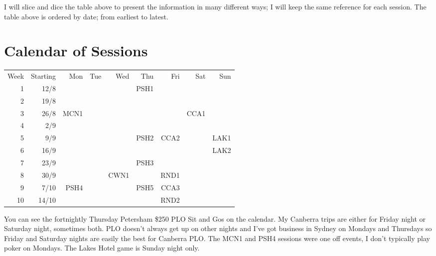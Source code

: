 I will slice and dice the table above to present the information in
many different ways; I will keep the same reference for each
session. The table above is ordered by date; from earliest to latest.

\section*{Calendar of Sessions}

\begin{tabular}{rrrrrrrrr}
  Week & Starting & Mon & Tue & Wed & Thu & Fri & Sat & Sun \\
  1 & 12/8  &     &     &     & PSH1 &     &     &     \\
  2 & 19/8  &     &     &     &      &     &     &     \\
  3 & 26/8  & MCN1 &    &     &      &     & CCA1 &    \\
  4 & 2/9  &      &    &     &      &     &     &     \\
  5 &  9/9  &     &     &     & PSH2 & CCA2&     & LAK1\\
  6 & 16/9  &     &     &     &      &     &     & LAK2\\
  7 & 23/9  &     &     &     & PSH3 &     &     &     \\
  8 & 30/9  &     &     & CWN1&      & RND1&     &     \\
  9 & 7/10 & PSH4 &    &     & PSH5 & CCA3&     &     \\
 10 & 14/10 &     &     &     &      & RND2&     &     \\
\end{tabular}

You can see the fortnightly Thursday Petersham \$250 PLO Sit and Gos
on the calendar. My Canberra trips are either for Friday night or
Saturday night, sometimes both. PLO doesn't always get up on other
nights and I've got business in Sydney on Mondays and Thursdays so
Friday and Saturday nights are easily the best for Canberra PLO. The
MCN1 and PSH4 sessions were one off events, I don't typically play
poker on Mondays. The Lakes Hotel game is Sunday night only.
